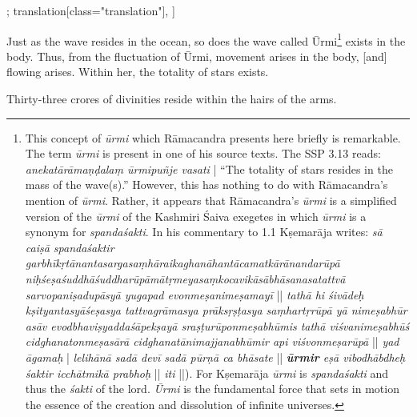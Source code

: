 \begin{alignment}[
  texts=edition[class="edition"];
  translation[class="translation"],
  ]
\begin{translation}
\begin{tlate}[p41_01]
Just as the wave resides in the ocean, so does the wave called Ūrmi\footnote{This concept of \textit{ūrmi} which Rāmacandra presents here briefly is remarkable. The term \textit{ūrmi} is present in one of his source texts. The SSP 3.13 reads: \textit{anekatārāmaṇḍalaṃ ūrmipuñje vasati} | ``The totality of stars resides in the mass of the wave(s).'' However, this has nothing to do with Rāmacandra's mention of \textit{ūrmi}. Rather, it appears that Rāmacandra's \textit{ūrmi} is a simplified version of the \textit{ūrmi} of the Kashmiri Śaiva exegetes in which \textit{ūrmi} is a synonym for \textit{spandaśakti}. In his commentary to  1.1 Kṣemarāja writes: \textit{sā caiṣā spandaśaktir garbhīkṛtānantasargasaṃhāraikaghanāhantācamatkārānandarūpā niḥśeṣaśuddhāśuddharūpāmātṛmeyasaṃkocavikāsābhāsanasatattvā sarvopaniṣadupāsyā yugapad evonmeṣanimeṣamayī} || \textit{tathā hi śivādeḥ kṣityantasyāśeṣasya tattvagrāmasya prāksṛṣṭasya saṃhartṛrūpā yā nimeṣabhūr asāv evodbhaviṣyaddaśāpekṣayā sraṣṭurūponmeṣabhūmis tathā viśvanimeṣabhūś cidghanatonmeṣasārā cidghanatānimajjanabhūmir api viśvonmeṣarūpā} || \textit{yad āgamaḥ} | \textit{lelihānā sadā devī sadā pūrṇā ca bhāsate} || \textit{\textbf{ūrmir} eṣā vibodhābdheḥ śaktir icchātmikā prabhoḥ} || \textit{iti} ||). For Kṣemarāja \textit{ūrmi} is \textit{spandaśakti} and thus the \textit{śakti} of the lord. \textit{Ūrmi} is the fundamental force that sets in motion the essence of the creation and dissolution of infinite universes.} exists in the body. Thus, from the fluctuation of Ūrmi, movement arises in the body, [and] flowing arises. Within her, the totality of stars exists.

Thirty-three crores of divinities reside within the hairs of the arms.
\flushpage
\end{tlate}
  \end{translation}
\end{alignment}
\pagebreak %
